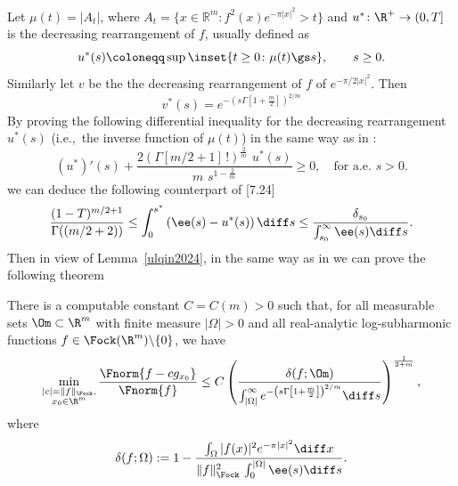 Let $\mu(t)=|A_t|$, where $A_t=\{x\in\mathbb{R}^m: f^2(x)e^{-\pi |x|^2}>t\}$ and
$u^*\colon \R^+\to (0,T]$ is the decreasing rearrangement of $f$, usually
defined as
\begin{equation}\label{eqn:defu*}
    u^*(s) \coloneqq \sup \inset{t \geq 0 \colon \mu(t) \gs s},\qquad
    s\geq 0.
\end{equation}
Similarly let $v$ be the the decreasing rearrangement of $f$ of $e^{-\pi/2 |x|^2}.$ Then $$v^\ast(s)=e^{-\left(s \Gamma\left[1+\frac{m}{2}\right]\right)^{2/m}}$$
By proving the following differential inequality for the decreasing rearrangement $u^*(s)$ (i.e.,\ the inverse function of $\mu(t)$) in the same way as in \cite{GomezGuerraRamosTilli2024}:
\begin{equation}
    \label{diffinequd}
    (u^*)'(s)+\frac {2(\Gamma[m/2+1]\,!)^{\frac {2}{m}}\,\, u^*(s)}{m \,\, s^{1-\frac {2}{m}}}\geq 0,\quad \text{for a.e. $s>0$.}
\end{equation}
we can deduce the following counterpart of \cite{GomezGuerraRamosTilli2024}[7.24]
\begin{equation}
    \label{estlemma1d}
\frac {(1-T)^{m/2+1}}{\Gamma((m/2+2))}\leq \int_0^{s^*}\left(\ee(s)-u^*(s)\right)\diff s\leq
\frac {\delta_{s_0}}{\int_{s_0}^\infty \ee(s)\diff s}.
\end{equation} Then in view of Lemma~\ref{ulqin2024}, in the same way as in \cite{GomezGuerraRamosTilli2024} we can prove the following theorem
\begin{numthm}\label{thm:StabilityFockSpaceDimensiond}
   There is a computable constant $C=C(m)>0$ such that, for all  measurable sets $\Om \subset \R^{m}$ with finite measure $|\Omega|>0$ and all real-analytic log-subharmonic functions $f\in \Fock(\R^m)\backslash\{0\}$, we have
    \begin{equation}\label{eqn:StabilityFunctionFockDimensiond}
        \min_{\substack{|c|=\|f\|_{\Fock},\\ x_0\in \R^m}} \frac{\Fnorm{f-cg_{x_0}}}{\Fnorm{f}} \leq
        C
        \left(\frac{\delta(f;\Om)}
      {\int_{|\Omega|}^\infty   e^{-\left(s \Gamma\left[1+\frac{m}{2}\right]\right)^{2/m}}\diff s  } \right)^{\frac 1 {2+m}},
    \end{equation}
where
\begin{equation}
\label{defdeltaFOd}
\delta(f;\Omega):=1-\frac{\int_\Omega |f(x)|^2 e^{-\pi |x|^2}\diff x}
{\Vert f\Vert_{\Fock}^2\, \int_0^{|\Omega|} \ee(s)\diff s}.
\end{equation}
\end{numthm}

